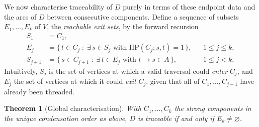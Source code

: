\documentclass[12pt]{article}
\newtheorem{theorem}{Theorem}
\theoremstyle{definition}
\newcommand{\Vv}{V}
\newcommand{\Aa}{A}
\begin{document}
We now characterise traceability of $D$ purely in terms of these endpoint data and
the arcs of $D$ between consecutive components. Define a sequence of subsets
$E_{1},\dots,E_{k}$ of $\Vv$, the \emph{reachable exit sets}, by the forward
recursion
\begin{align}
S_{1} &= C_{1}, \label{eq:S1}\\
E_{j} &= \{\,t\in C_{j}\;:\;\exists\, s\in S_{j}\text{ with }
            \mathrm{HP}(C_{j};s,t)=1\,\}, &&1\le j\le k, \label{eq:Ej}\\
S_{j+1} &= \{\,s\in C_{j+1}\;:\;\exists\, t\in E_{j}\text{ with } t\to s\in \Aa\,\},
            &&1\le j<k. \label{eq:Sj}
\end{align}
Intuitively, $S_{j}$ is the set of vertices at which a valid traversal could
\emph{enter} $C_{j}$, and $E_{j}$ the set of vertices at which it could \emph{exit}
$C_{j}$, given that all of $C_{1},\dots,C_{j-1}$ have already been threaded.

\begin{theorem}[Global characterisation]\label{thm:global}
With $C_{1},\dots,C_{k}$ the strong components in the unique condensation order as
above, $D$ is traceable if and only if $E_{k}\neq\varnothing$.
\end{theorem}
\end{document}
